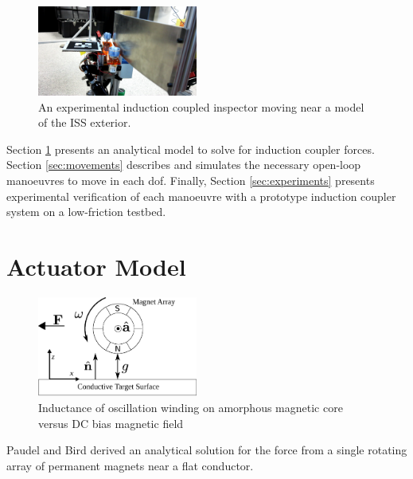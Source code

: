 \documentclass[letterpaper, 10 pt, conference]{ieeeconf}  %
\begin{document}
%
 \begin{figure}[thpb]
      \centering

      \includegraphics[width = 0.47\textwidth]{figures/screenshot.png}
      \caption{An experimental induction coupled inspector moving near a model of the ISS exterior.}
      \label{fig:realpicture}
   \end{figure}

Section \ref{sec:model} presents an analytical model to solve for induction coupler forces. Section \ref{sec:movements} describes and simulates the necessary open-loop manoeuvres to move in each dof. Finally, Section \ref{sec:experiments} presents experimental verification of each manoeuvre with a prototype induction coupler system on a low-friction testbed.
%

  
\section{Actuator Model}
\label{sec:model}
 \begin{figure}[thpb]
      \centering

      \includegraphics[width = 0.47\textwidth]{figures/spin_mag_diagram.eps}
      \caption{Inductance of oscillation winding on amorphous
       magnetic core versus DC bias magnetic field}
      \label{A single induction coupler}
   \end{figure}
   

Paudel and Bird derived an analytical solution for the force from a single rotating array of permanent magnets near a flat conductor. \cite{Paudel2013}
\end{document}
